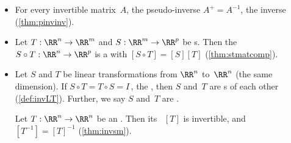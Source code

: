 \begin{itemize}
\item For every invertible matrix~\(A\), the pseudo-inverse \(A^+=A^{-1}\), the inverse (\cref{thm:pinvinv}).

\item Let \(T:\RR^n\to\RR^m\) and \(S:\RR^m\to\RR^p\) be s.  
Then the  \(S\circ T:\RR^n\to\RR^p\) is a  with  \([S\circ T]=[S][T]\) (\cref{thm:stmatcomp}).

\item Let \(S\) and \(T\) be linear transformations from \(\RR^n\) to~\(\RR^n\) (the same dimension).
If \(S\circ T=T\circ S=I\)\,, the , then \(S\) and~\(T\) are s of each other (\cref{def:invLT}).  
Further, we say \(S\) and~\(T\) are .

\itemme Let \(T:\RR^n\to\RR^n\) be an  . 
Then its ~\([T]\) is invertible, and \([T^{-1}]=[T]^{-1}\) (\cref{thm:invsm}). 

\end{itemize}





\makeanswers
